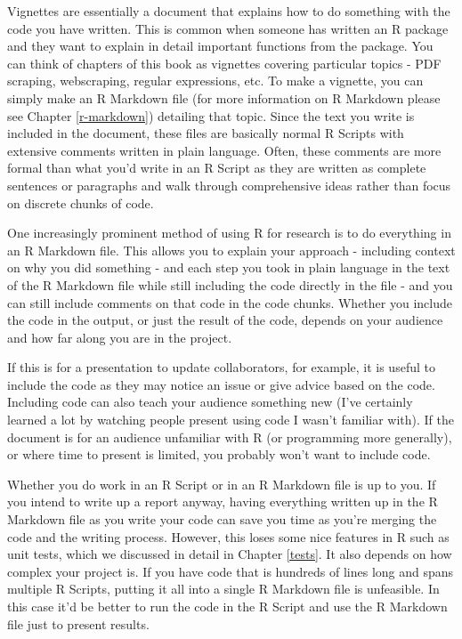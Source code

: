 \documentclass[
  12pt,
]{book}
\begin{document}
Vignettes are essentially a document that explains how to do something with the code you have written. This is common when someone has written an R package and they want to explain in detail important functions from the package. You can think of chapters of this book as vignettes covering particular topics - PDF scraping, webscraping, regular expressions, etc. To make a vignette, you can simply make an R Markdown file (for more information on R Markdown please see Chapter \ref{r-markdown}) detailing that topic. Since the text you write is included in the document, these files are basically normal R Scripts with extensive comments written in plain language. Often, these comments are more formal than what you'd write in an R Script as they are written as complete sentences or paragraphs and walk through comprehensive ideas rather than focus on discrete chunks of code.

One increasingly prominent method of using R for research is to do everything in an R Markdown file. This allows you to explain your approach - including context on why you did something - and each step you took in plain language in the text of the R Markdown file while still including the code directly in the file - and you can still include comments on that code in the code chunks. Whether you include the code in the output, or just the result of the code, depends on your audience and how far along you are in the project.

If this is for a presentation to update collaborators, for example, it is useful to include the code as they may notice an issue or give advice based on the code. Including code can also teach your audience something new (I've certainly learned a lot by watching people present using code I wasn't familiar with). If the document is for an audience unfamiliar with R (or programming more generally), or where time to present is limited, you probably won't want to include code.

Whether you do work in an R Script or in an R Markdown file is up to you. If you intend to write up a report anyway, having everything written up in the R Markdown file as you write your code can save you time as you're merging the code and the writing process. However, this loses some nice features in R such as unit tests, which we discussed in detail in Chapter \ref{tests}. It also depends on how complex your project is. If you have code that is hundreds of lines long and spans multiple R Scripts, putting it all into a single R Markdown file is unfeasible. In this case it'd be better to run the code in the R Script and use the R Markdown file just to present results.
\end{document}
